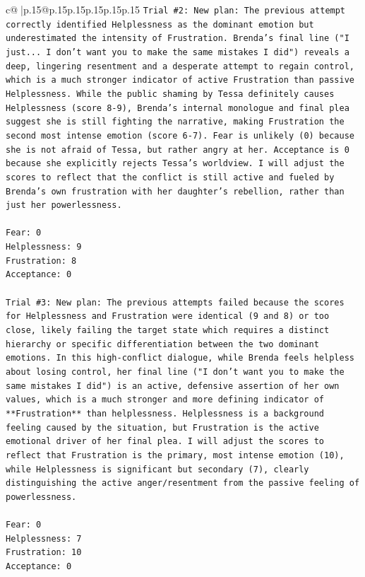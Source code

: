 \documentclass{article}
\begin{document}
{\begin{supertabular}{c@{$\;$}|p{.15\linewidth}@{}p{.15\linewidth}p{.15\linewidth}p{.15\linewidth}p{.15\linewidth}p{.15\linewidth}}
{{{\texttt{Trial \#2: New plan: The previous attempt correctly identified Helplessness as the dominant emotion but underestimated the intensity of Frustration. Brenda's final line ("I just... I don't want you to make the same mistakes I did") reveals a deep, lingering resentment and a desperate attempt to regain control, which is a much stronger indicator of active Frustration than passive Helplessness. While the public shaming by Tessa definitely causes Helplessness (score 8{-}9), Brenda's internal monologue and final plea suggest she is still fighting the narrative, making Frustration the second most intense emotion (score 6{-}7). Fear is unlikely (0) because she is not afraid of Tessa, but rather angry at her. Acceptance is 0 because she explicitly rejects Tessa's worldview. I will adjust the scores to reflect that the conflict is still active and fueled by Brenda's own frustration with her daughter's rebellion, rather than just her powerlessness.} \\
\\ 
\texttt{Fear: 0} \\
\texttt{Helplessness: 9} \\
\texttt{Frustration: 8} \\
\texttt{Acceptance: 0} \\
\\ 
\texttt{Trial \#3: New plan: The previous attempts failed because the scores for Helplessness and Frustration were identical (9 and 8) or too close, likely failing the target state which requires a distinct hierarchy or specific differentiation between the two dominant emotions. In this high{-}conflict dialogue, while Brenda feels helpless about losing control, her final line ("I don't want you to make the same mistakes I did") is an active, defensive assertion of her own values, which is a much stronger and more defining indicator of **Frustration** than helplessness. Helplessness is a background feeling caused by the situation, but Frustration is the active emotional driver of her final plea. I will adjust the scores to reflect that Frustration is the primary, most intense emotion (10), while Helplessness is significant but secondary (7), clearly distinguishing the active anger/resentment from the passive feeling of powerlessness.} \\
\\ 
\texttt{Fear: 0} \\
\texttt{Helplessness: 7} \\
\texttt{Frustration: 10} \\
\texttt{Acceptance: 0} \\
}}}
\end{supertabular}}
\end{document}
